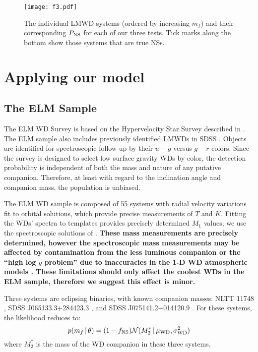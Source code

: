 \documentclass[apjl]{emulateapj}
\newcommand{\given}{\,|\,}
\newcommand{\Msun}{\ifmmode {{\rm M}_{\odot}}\else M$_{\odot}$\fi}
\newcommand{\period}{T}
\newcommand{\mf}{m_f}
\begin{document}
\begin{figure*}[h!]
\begin{center}
\texttt{[image: f3.pdf]}
\caption{ The individual LMWD systems (ordered by increasing $\mf$) and their corresponding $P_{\rm NS}$ for each of our three tests. Tick marks along the bottom show those systems that are true NSs.}
\label{fig:P_NS}
\end{center}
\end{figure*}



\section{Applying our model}

\subsection{The ELM Sample}


The ELM WD Survey is based on the Hypervelocity Star Survey described in \citet{brown06}. The ELM sample also includes previously identified LMWDs in SDSS \citep{eisenstein06,liebert04}. Objects are identified for spectroscopic follow-up by their $u-g$ versus $g-r$ colors. Since the survey is designed to select low surface gravity WDs by color, the detection probability is independent of both the mass and nature of any putative companion. Therefore, at least with regard to the inclination angle and companion mass, the population is unbiased.


The ELM WD sample is composed of 55 systems with radial velocity variations fit to orbital solutions, which provide precise measurements of $\period$ and $K$. Fitting the WDs' spectra to templates provides precisely determined $M_1$ values; we use the spectroscopic solutions of \citet{gianninas14}. {\bf These mass measurements are precisely determined, however the spectroscopic mass measurements may be affected by contamination from the less luminous companion or the ``high log $g$ problem'' due to inaccuracies in the 1-D WD atmospheric models \citep{tremblay13}. These limitations should only affect the coolest WDs in the ELM sample, therefore we suggest this effect is minor.}


Three systems are eclipsing binaries, with known companion masses: NLTT 11748 \citep[$M_2=0.72~\Msun$;][]{kaplan14}, SDSS J065133.3$+$284423.3 \citep[$M_2=0.50~\Msun$;][]{brown11b}, and SDSS J075141.2$-$014120.9 \citep[$M_2=0.97~\Msun$;][]{kilic14}. For these systems, the likelihood reduces to:
\begin{equation}
p(\mf \given \theta) = (1-f_{\rm NS}) \mathcal{N}(M_2^* \given \mu_{\rm WD}, \sigma^2_{\rm WD})
\end{equation}
where $M_2^*$ is the mass of the WD companion in these three systems. 
\end{document}

